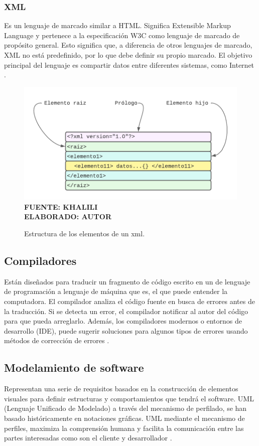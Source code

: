 \subsubsection{XML}
\sloppy
Es un lenguaje de marcado similar a HTML. Significa Extensible Markup Language y pertenece a la especificación W3C como lenguaje de marcado de propósito general. Esto significa que, a diferencia de otros lenguajes de marcado, XML no está predefinido, por lo que debe definir su propio marcado. El objetivo principal del lenguaje es compartir datos entre diferentes sistemas, como Internet \cite{XML-based}.

\begin{figure}[h!]
    \centering
	\caption{Estructura de los elementos de un xml.}
	\includegraphics[width=12cm]{img/xml.png}
	\label{fig:xml}
	\vspace{4mm}
	{\footnotesize \textbf{\\ FUENTE: KHALILI \cite{XML-based} \\ ELABORADO: AUTOR}}
\end{figure}

\subsection{Compiladores}
\sloppy
Están diseñados para traducir un fragmento de código escrito en un de lenguaje de programación a lenguaje de máquina que es, el que puede entender la computadora. El compilador analiza el código fuente en busca de errores antes de la traducción. Si se detecta un error, el compilador notificar al autor del código para que pueda arreglarlo. Además, los compiladores modernos o entornos de desarrollo (IDE), puede sugerir soluciones para algunos tipos de errores usando métodos de corrección de errores \cite{CoEdit}.

\subsection{Modelamiento de software}
Representan una serie de requisitos basados en la construcción de elementos visuales para definir estructuras y comportamientos que tendrá el software. UML (Lenguaje Unificado de Modelado) a través del mecanismo de perfilado, se han basado históricamente en notaciones gráficas. UML mediante el mecanismo de perfiles, maximiza la comprensión humana y facilita la comunicación entre las partes interesadas como son el cliente y desarrollador \cite{Blended}. 


